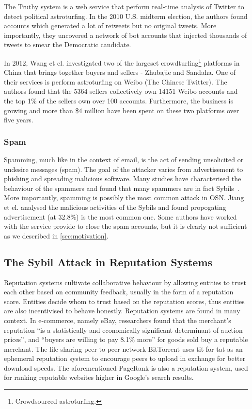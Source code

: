 The Truthy system\cite{ratkiewicz2011truthy} is a web service that perform
real-time analysis of Twitter to detect political astroturfing. In the 2010
U.S. midterm election, the authors found accounts which generated a lot of
retweets but no original tweets. More importantly, they uncovered a network of
bot accounts that injected thousands of tweets to smear the Democratic candidate.

In 2012, Wang et el. investigated two of the largeset
crowdturfing\footnote{Crowdsourced astroturfing.} platforms in China that brings
together buyers and sellers - Zhubajie and Sandaha. One of their services is
perform astroturfing on Weibo (The Chinese Twitter). The authors found that the
5364 sellers collectively own 14151 Weibo accounts and the top 1\% of the
sellers own over 100 accounts. Furthermore, the business is growing and more
than \$4 million have been spent on these two platforms over five
years\cite{wang2012serf}.

\subsubsection{Spam}
Spamming, much like in the context of email, is the act of sending unsolicited
or undesire messages (spam). The goal of the attacker varies from advertisement
to phishing and spreading malicious software\cite{twittermalware1,
  twittermalware2}. Many studies have characterised the behaviour of the
spammers and found that many spammers are in fact
Sybils~\cite{stringhini2010detecting, yang2012analyzing, grier2010spam,
  jiang2015understanding}. More importantly, spamming is possibly the most
common attack in OSN. Jiang et el. analysed the malicious activities of the
Sybils and found propogating advertisement (at 32.8\%) is the most common
one\cite{jiang2015understanding}. Some authors have worked with the service
provide to close the spam accounts, but it is clearly not sufficient as we
described in \autoref{sec:motivation}.


\subsection{The Sybil Attack in Reputation Systems}
\label{sec:reputation-attack}
Reputation systems cultivate collaborative behaviour by allowing entities to
trust each other based on community feedback, usually in the form of a
reputation score. Entities decide whom to trust based on the reputation scores,
thus entities are also incentivised to behave honestly. Reputation systems are
found in many context. In e-commerce, namely eBay, researchers found that the
merchant's reputation ``is a statistically and economically significant
determinant of auction prices''\cite{houser2006reputation}, and ``buyers are
willing to pay 8.1\% more'' for goods sold buy a reputable
merchant\cite{resnick2006value}. The file sharing peer-to-peer network
BitTorrent uses tit-for-tat as an ephemeral reputation system to encourage peers
to upload in exchange for better download speeds\cite{cohen2003incentives}. The
aforementioned PageRank\cite{page1999pagerank} is also a reputation system, used
for ranking reputable websites higher in Google's search results.

